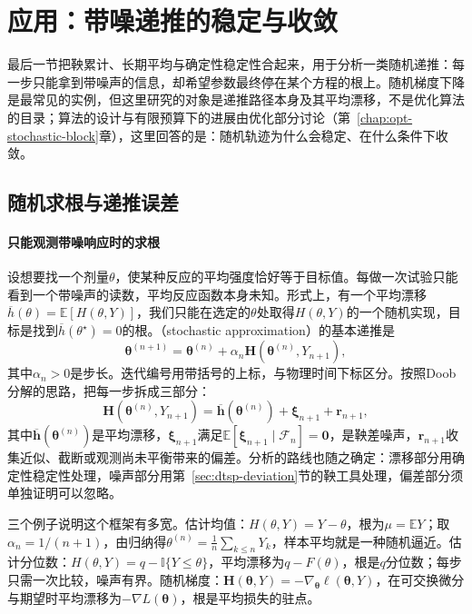 \section{应用：带噪递推的稳定与收敛}
\label{sec:dtsp-stochastic-approximation}

最后一节把鞅累计、长期平均与确定性稳定性合起来，用于分析一类随机递推：每一步只能拿到带噪声的信息，却希望参数最终停在某个方程的根上。随机梯度下降是最常见的实例，但这里研究的对象是递推路径本身及其平均漂移，不是优化算法的目录；算法的设计与有限预算下的进展由优化部分讨论（第~\ref{chap:opt-stochastic-block}章），这里回答的是：随机轨迹为什么会稳定、在什么条件下收敛。

\subsection{随机求根与递推误差}
\label{sec:dtsp-root-finding}

\paragraph{只能观测带噪响应时的求根}
设想要找一个剂量$\theta$，使某种反应的平均强度恰好等于目标值。每做一次试验只能看到一个带噪声的读数，平均反应函数本身未知。形式上，有一个平均漂移$\overline h(\theta)=\mathbb E[H(\theta,Y)]$，我们只能在选定的$\theta$处取得$H(\theta,Y)$的一个随机实现，目标是找到$\overline h(\theta^\star)=0$的根。（stochastic approximation）的基本递推是
\begin{equation}
  \bm\theta^{(n+1)}=\bm\theta^{(n)}+\alpha_n\bm H(\bm\theta^{(n)},Y_{n+1}),
  \label{eq:dtsp-robbins-monro}
\end{equation}
其中$\alpha_n>0$是步长。迭代编号用带括号的上标，与物理时间下标区分。按照Doob分解的思路，把每一步拆成三部分：
\begin{equation}
  \bm H(\bm\theta^{(n)},Y_{n+1})=\overline{\bm h}(\bm\theta^{(n)})+\bm\xi_{n+1}+\bm r_{n+1},
  \label{eq:dtsp-sa-decomposition}
\end{equation}
其中$\overline{\bm h}(\bm\theta^{(n)})$是平均漂移，$\bm\xi_{n+1}$满足$\mathbb E[\bm\xi_{n+1}\mid\mathcal F_n]=\bm 0$，是鞅差噪声，$\bm r_{n+1}$收集近似、截断或观测尚未平衡带来的偏差。分析的路线也随之确定：漂移部分用确定性稳定性处理，噪声部分用第~\ref{sec:dtsp-deviation}节的鞅工具处理，偏差部分须单独证明可以忽略。

三个例子说明这个框架有多宽。估计均值：$H(\theta,Y)=Y-\theta$，根为$\mu=\mathbb EY$；取$\alpha_n=1/(n+1)$，由归纳得$\theta^{(n)}=\frac1n\sum_{k\leq n}Y_k$，样本平均就是一种随机逼近。估计分位数：$H(\theta,Y)=q-\mathbb I\{Y\leq\theta\}$，平均漂移为$q-F(\theta)$，根是$q$分位数；每步只需一次比较，噪声有界。随机梯度：$\bm H(\bm\theta,Y)=-\nabla_{\bm\theta}\ell(\bm\theta,Y)$，在可交换微分与期望时平均漂移为$-\nabla L(\bm\theta)$，根是平均损失的驻点。

